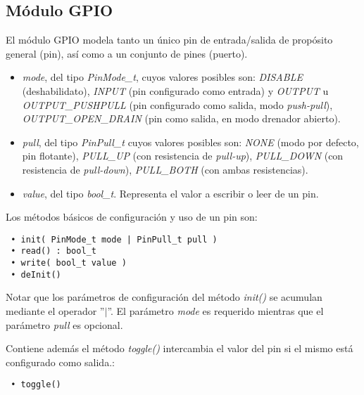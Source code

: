 \subsection{Módulo GPIO}

El módulo GPIO modela tanto un único pin de entrada/salida de propósito general (pin), así como a un conjunto de pines (puerto). 


\begin{itemize}
\item
\emph{mode}, del tipo \emph{PinMode\_t}, cuyos valores posibles son: \emph{DISABLE} (deshabilidato), \emph{INPUT} (pin configurado como entrada) y \emph{OUTPUT} u \emph{OUTPUT\_PUSHPULL} (pin configurado como salida, modo \emph{push-pull}), \emph{OUTPUT\_OPEN\_DRAIN} (pin como salida, en modo drenador abierto).
\item
\emph{pull}, del tipo \emph{PinPull\_t} cuyos valores posibles son: \emph{NONE} (modo por defecto, pin flotante), \emph{PULL\_UP} (con resistencia de \emph{pull-up}), \emph{PULL\_DOWN} (con resistencia de \emph{pull-down}), \emph{PULL\_BOTH} (con ambas resistencias).
\item
\emph{value}, del tipo \emph{bool\_t}. Representa el valor a escribir o leer de un pin.
\end{itemize}


Los métodos básicos de configuración y uso de un pin son:

\begin{verbatim}
 • init( PinMode_t mode | PinPull_t pull )
 • read() : bool_t
 • write( bool_t value )
 • deInit()
\end{verbatim}


Notar que los parámetros de configuración del método \emph{init()} se acumulan mediante el operador ''$|$''. El parámetro \emph{mode} es requerido mientras que el parámetro \emph{pull} es opcional.

Contiene además el método \emph{toggle()} intercambia el valor del pin si el mismo está configurado como salida.:

\begin{verbatim}
 • toggle()
\end{verbatim}

